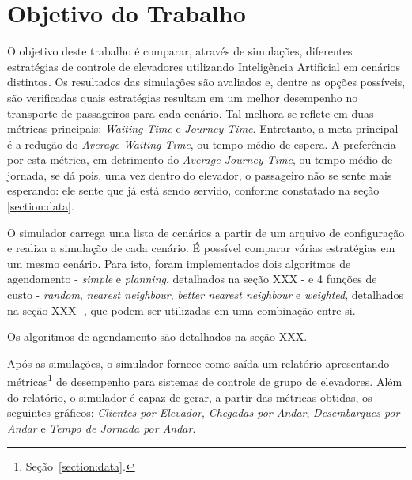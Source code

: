 \chapter{\label{chap:objectives}Objetivo do Trabalho}

O objetivo deste trabalho é comparar, através de simulações, diferentes
estratégias de controle de elevadores utilizando Inteligência Artificial em
cenários distintos. Os resultados das simulações são avaliados e, dentre as
opções possíveis, são verificadas quais estratégias resultam em um melhor
desempenho no transporte de passageiros para cada cenário. Tal melhora se
reflete em duas métricas principais: \textit{Waiting Time} e \textit{Journey
Time}. Entretanto, a meta principal é a redução do \textit{Average Waiting
Time}, ou tempo médio de espera. A preferência por esta métrica, em detrimento
do \textit{Average Journey Time}, ou tempo médio de jornada, se dá pois, uma vez
dentro do elevador, o passageiro não se sente mais esperando: ele sente que já
está sendo servido, conforme constatado na seção \ref{section:data}.

O simulador carrega uma lista de cenários a partir de um arquivo de configuração
e realiza a simulação de cada cenário. É possível comparar várias estratégias em
um mesmo cenário. Para isto, foram implementados dois algoritmos de agendamento
- \textit{simple} e \textit{planning}, detalhados na seção XXX - e 4 funções de
custo - \textit{random}, \textit{nearest neighbour}, \textit{better nearest
neighbour} e \textit{weighted}, detalhados na seção XXX -, que podem ser
utilizadas em uma combinação entre si.

Os algoritmos de agendamento são detalhados na seção XXX. 

Após as simulações, o simulador fornece como saída um relatório apresentando
métricas\footnote{Seção~\ref{section:data}.} de desempenho para sistemas de
controle de grupo de elevadores. Além do relatório, o simulador é capaz de
gerar, a partir das métricas obtidas, os seguintes gráficos: \textit{Clientes
  por Elevador}, \textit{Chegadas por Andar}, \textit{Desembarques por Andar} e
\textit{Tempo de Jornada por Andar}.


